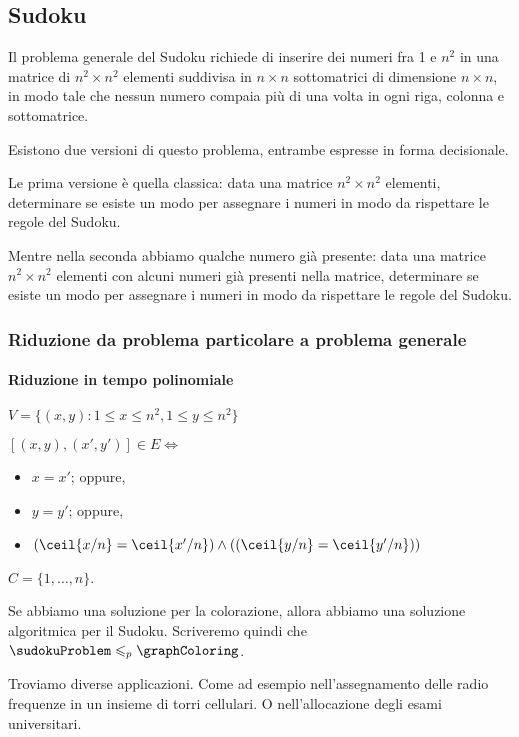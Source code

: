 \subsection{Sudoku}

Il problema generale del Sudoku richiede di inserire dei numeri fra 1 e \(n^2\) in una matrice di \(n^2 \times n^2\) elementi suddivisa in \(n \times n\) sottomatrici di dimensione \(n \times n\), in modo tale che nessun numero compaia più di una volta in ogni riga, colonna e sottomatrice.

Esistono due versioni di questo problema, entrambe espresse in forma decisionale.

Le prima versione è quella classica: data una matrice \(n^2 \times n^2\) elementi, determinare se esiste un modo per assegnare i numeri in modo da rispettare le regole del Sudoku.

Mentre nella seconda abbiamo qualche numero già presente: data una matrice \(n^2 \times n^2\) elementi con alcuni numeri già presenti nella matrice, determinare se esiste un modo per assegnare i numeri in modo da rispettare le regole del Sudoku.

\subsubsection*{Riduzione da problema particolare a problema generale}

\paragraph{Riduzione in tempo polinomiale}
\(V = \{(x,y): 1 \leqslant x \leqslant n^2, 1 \leqslant y \leqslant n^2\}\)

\([(x,y),(x',y')] \in E \Leftrightarrow\)
\begin{itemize}
    \item \(x = x'\); oppure,
    \item \(y = y'\); oppure,
    \item \((\ceil{x/n} = \ceil{x'/n}) \land ((\ceil{y/n} = \ceil{y'/n}))\)
\end{itemize}
\(C = \{1, \dots, n\}\).

Se abbiamo una soluzione per la colorazione, allora abbiamo una soluzione algoritmica per il Sudoku. Scriveremo quindi che \(\sudokuProblem \leqslant_p \graphColoring\).

Troviamo diverse applicazioni. Come ad esempio nell'assegnamento delle radio frequenze in un insieme di torri cellulari. O nell'allocazione degli esami universitari.

